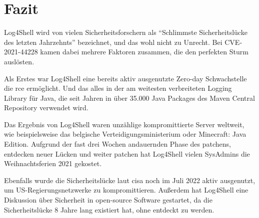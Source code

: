 
\section{Fazit}\label{sec:fazit}
Log4Shell wird von vielen Sicherheitsforschern als ``Schlimmste Sicherheitslücke des letzten Jahrzehnts'' bezeichnet, und das wohl nicht zu Unrecht.
Bei CVE-2021-44228 kamen dabei mehrere Faktoren zusammen, die den perfekten Sturm auslösten.

Als Erstes war Log4Shell eine bereits aktiv ausgenutzte Zero-day Schwachstelle die \gls{rce} ermöglicht.
Und das alles in der am weitesten verbreiteten Logging Library für Java, die seit Jahren in über 35.000 Java Packages des Maven Central Repository verwendet wird.

Das Ergebnis von Log4Shell waren unzählige kompromittierte Server weltweit, wie beispielsweise das belgische Verteidigungsministerium oder Minecraft: Java Edition.
Aufgrund der fast drei Wochen andauernden Phase des patchens, entdecken neuer Lücken und weiter patchen hat Log4Shell vielen SysAdmins die Weihnachtsferien 2021 gekostet.

Ebenfalls wurde die Sicherheitslücke laut \gls{cisa} noch im Juli 2022 aktiv ausgenutzt, um US-Regierungsnetzwerke zu kompromittieren.
Außerdem hat Log4Shell eine Diskussion über Sicherheit in open-source Software gestartet, da die Sicherheitslücke 8 Jahre lang existiert hat, ohne entdeckt zu werden.
\clearpage